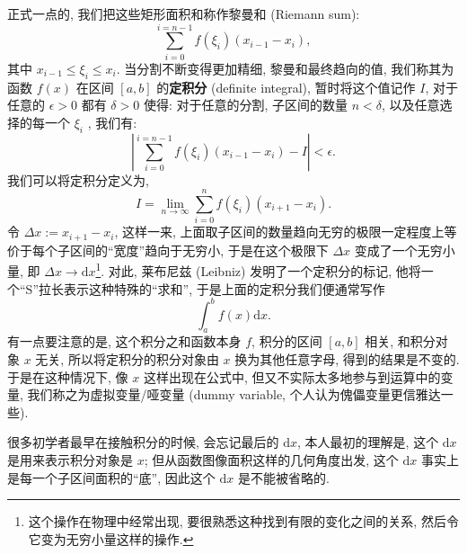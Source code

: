 \begin{tcolorbox}[size=fbox, breakable, enhanced jigsaw, title={积分 (integration)}]
正式一点的, 我们把这些矩形面积和称作黎曼和 (Riemann sum): \[
\sum_{i=0}^{i=n-1}f(\xi_i)(x_{i-1}-x_i),
\] 其中 $x_{i-1}\le\xi_i\le x_i$. 当分割不断变得更加精细,
黎曼和最终趋向的值, 我们称其为函数 $f(x)$ 在区间 $[a,b]$
的\textbf{定积分} (definite integral), 暂时将这个值记作 $I$,
对于任意的 $\epsilon>0$ 都有 $\delta>0$ 使得: 对于任意的分割,
子区间的数量 $n<\delta$, 以及任意选择的每一个 $\xi_i$ , 我们有: \[
\left|\sum_{i=0}^{i=n-1}f(\xi_i)(x_{i-1}-x_i)-I\right|<\epsilon.
\] 我们可以将定积分定义为, \[
\boxed{I=\lim_{n\rightarrow\infty}\sum_{i=0}^nf(\xi_i)(x_{i+1}-x_i).}
\] 令 $\Delta x:=x_{i+1}-x_i$, 这样一来,
上面取子区间的数量趋向无穷的极限一定程度上等价于每个子区间的``宽度''趋向于无穷小,
于是在这个极限下 $\Delta x$ 变成了一个无穷小量, 即
$\Delta x\rightarrow \mathrm{d}x$\footnote{这个操作在物理中经常出现,
  要很熟悉这种找到有限的变化之间的关系, 然后令它变为无穷小量这样的操作.}.
对此, 莱布尼兹 (Leibniz) 发明了一个定积分的标记,
他将一个``S''拉长表示这种特殊的``求和'', 于是上面的定积分我们便通常写作
\[
\boxed{\int_a^bf(x)\mathrm{d}x.}
\] 有一点要注意的是, 这个积分之和函数本身 $f$, 积分的区间 $[a,b]$
相关, 和积分对象 $x$ 无关, 所以将定积分的积分对象由 $x$
换为其他任意字母, 得到的结果是不变的. 于是在这种情况下, 像 $x$
这样出现在公式中, 但又不实际太多地参与到运算中的变量,
我们称之为虚拟变量/哑变量 (dummy variable,
个人认为傀儡变量更信雅达一些).

\begin{newquote}
很多初学者最早在接触积分的时候, 会忘记最后的 $\mathrm{d}x$,
本人最初的理解是, 这个 $\mathrm{d}x$ 是用来表示积分对象是 $x$;
但从函数图像面积这样的几何角度出发, 这个 $\mathrm{d}x$
事实上是每一个子区间面积的``底'', 因此这个 $\mathrm{d}x$
是不能被省略的.
\end{newquote}

\end{tcolorbox}

